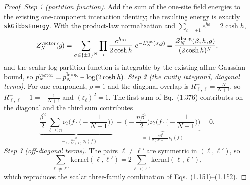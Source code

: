 \begin{proof}
\emph{Step 1 (partition function).} Add the sum of the one-site field energies to the existing one-component interaction identity; the resulting energy is exactly \texttt{skGibbsEnergy}. With the product-law normalization and $\sum_{\varepsilon=\pm1}e^{h\varepsilon}=2\cosh h$,
\[
Z_N^{\rm vector}(g)=\sum_{\sigma\in\{\pm1\}^N}\prod_i\frac{e^{h\sigma_i}}{2\cosh h}\;e^{-H^{\rm int}_N(\sigma,g)}=\frac{Z_N^{\rm Ising}(\beta,h,g)}{(2\cosh h)^N},
\]
and the scalar log-partition function is integrable by the existing affine-Gaussian bound, so $p_N^{\rm vector}=p_N^{\rm Ising}-\log(2\cosh h)$.
\emph{Step 2 (the cavity integrand, diagonal terms).} For one component, $\rho=1$ and the diagonal overlap is $R^-_{\ell,\ell}=\frac N{N+1}$, so $R^-_{\ell,\ell}-1=-\frac1{N+1}$ and $(\varepsilon_\ell)^2=1$. The first sum of Eq.~(1.376) contributes on the diagonal and the third sum contributes
\[
\underbrace{\frac{\beta^2}2\sum_{\ell\le n}\nu_t\Big(f\cdot\Big(-\frac1{N+1}\Big)\Big)}_{=-\frac{n\beta^2}{2(N+1)}\nu_t(f)}\ +\ \underbrace{\Big(-\frac{n\beta^2}2\Big)\nu_t\Big(f\cdot\Big(-\frac1{N+1}\Big)\Big)}_{=+\frac{n\beta^2}{2(N+1)}\nu_t(f)}=0 .
\]
\emph{Step 3 (off-diagonal terms).} The pairs $\ell\ne\ell'$ are symmetric in $(\ell,\ell')$, so
\[
\sum_{\ell\ne\ell'}\mathrm{kernel}(\ell,\ell')=2\sum_{\ell<\ell'}\mathrm{kernel}(\ell,\ell'),
\]
which reproduces the scalar three-family combination of Eqs.~(1.151)--(1.152).
\end{proof}

